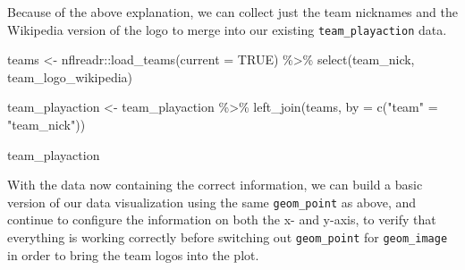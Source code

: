 \documentclass[
  letterpaper,
]{krantz}
\newenvironment{Shaded}{\begin{snugshade}}{\end{snugshade}}
\newcommand{\AttributeTok}[1]{\textcolor[rgb]{0.40,0.45,0.13}{#1}}
\newcommand{\ConstantTok}[1]{\textcolor[rgb]{0.56,0.35,0.01}{#1}}
\newcommand{\FunctionTok}[1]{\textcolor[rgb]{0.28,0.35,0.67}{#1}}
\newcommand{\NormalTok}[1]{\textcolor[rgb]{0.00,0.23,0.31}{#1}}
\newcommand{\OtherTok}[1]{\textcolor[rgb]{0.00,0.23,0.31}{#1}}
\newcommand{\SpecialCharTok}[1]{\textcolor[rgb]{0.37,0.37,0.37}{#1}}
\newcommand{\StringTok}[1]{\textcolor[rgb]{0.13,0.47,0.30}{#1}}
\begin{document}
Because of the above explanation, we can collect just the team nicknames
and the Wikipedia version of the logo to merge into our existing
\texttt{team\_playaction} data.

\begin{Shaded}
\begin{Highlighting}[]
\NormalTok{teams }\OtherTok{\textless{}{-}}\NormalTok{ nflreadr}\SpecialCharTok{::}\FunctionTok{load\_teams}\NormalTok{(}\AttributeTok{current =} \ConstantTok{TRUE}\NormalTok{) }\SpecialCharTok{\%\textgreater{}\%}
  \FunctionTok{select}\NormalTok{(team\_nick, team\_logo\_wikipedia)}

\NormalTok{team\_playaction }\OtherTok{\textless{}{-}}\NormalTok{ team\_playaction }\SpecialCharTok{\%\textgreater{}\%}
  \FunctionTok{left\_join}\NormalTok{(teams, }\AttributeTok{by =} \FunctionTok{c}\NormalTok{(}\StringTok{"team"} \OtherTok{=} \StringTok{"team\_nick"}\NormalTok{))}

\NormalTok{team\_playaction}
\end{Highlighting}
\end{Shaded}

With the data now containing the correct information, we can build a
basic version of our data visualization using the same
\texttt{geom\_point} as above, and continue to configure the information
on both the x- and y-axis, to verify that everything is working
correctly before switching out \texttt{geom\_point} for
\texttt{geom\_image} in order to bring the team logos into the plot.
\end{document}
